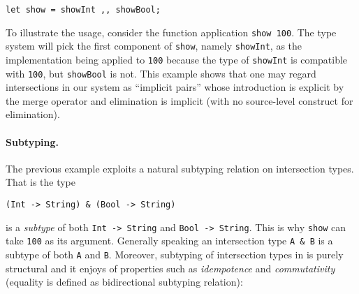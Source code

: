 \begin{lstlisting}
let show = showInt ,, showBool;
\end{lstlisting}

To illustrate the usage, consider the function application \lstinline{show 100}.
The type system will pick the first component of \lstinline{show}, namely
\lstinline{showInt}, as the implementation being applied to \lstinline{100}
because the type of \lstinline{showInt} is compatible with \lstinline{100}, but
\lstinline{showBool} is not. This example shows that one may regard
intersections in our system as ``implicit pairs'' whose introduction is explicit
by the merge operator and elimination is implicit (with no source-level
construct for elimination).








\paragraph{Subtyping.} The previous example exploits a natural
subtyping relation on intersection types. That is the type

\begin{lstlisting}
(Int -> String) & (Bool -> String) 
\end{lstlisting}

\noindent is a \emph{subtype} of both \lstinline{Int -> String} and
\lstinline{Bool -> String}. This is why \lstinline{show} can take
\lstinline{100} as its argument. Generally speaking an intersection type
\lstinline{A & B} is a subtype of both \lstinline{A} and \lstinline{B}.
Moreover, subtyping of intersection types in \name is purely structural
and it enjoys of properties such as \emph{idempotence} and \emph{commutativity} (equality is defined as bidirectional subtyping relation): \\

